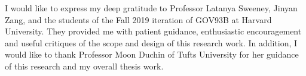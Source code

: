 
\noindent I would like to express my deep gratitude to Professor Latanya Sweeney, Jinyan Zang, and the students of the Fall 2019 iteration of GOV93B at Harvard University. They provided me with patient guidance, enthusiastic encouragement and useful critiques of the scope and design of this research work. In addition, I would like to thank Professor Moon Duchin of Tufts University for her guidance of this research and my overall thesis work.
